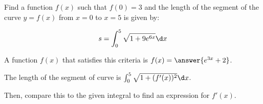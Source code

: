 \documentclass{ximera}
\author{Jim Talamo}
\begin{document}
\begin{exercise}

Find a function $f(x)$ such that $f(0)=3$ and the length of the segment of the curve $y=f(x)$ from $x=0$ to $x=5$ is given by:

\[
s= \int_0^5 \sqrt{1+9e^{6x}} \d x
\]

A function $f(x)$ that satisfies this criteria is $f(x) = \answer{e^{3x}+2}$.

\begin{hint}
The length of the segment of curve is $\int_0^5 \sqrt{1+(f'(x))^2} \d x$.

Then, compare this to the given integral to find an expression for $f'(x)$.
\end{hint}

\end{exercise}
\end{document}
